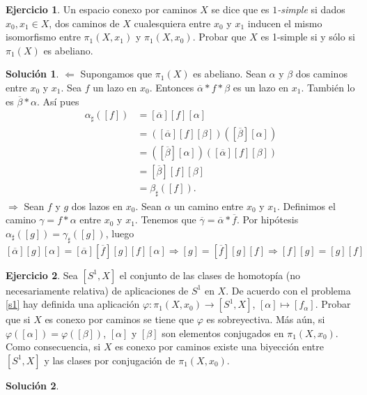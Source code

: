 \documentclass{article}
\theoremstyle{plain}
\theoremstyle{definition}
\newtheorem{exercise}{Ejercicio}
\newtheorem*{sol*}{Solución}
\begin{document}
\vspace{0.1cm}

\newpage \begin{exercise} Un espacio conexo por caminos $X$ se dice que es {\it $1$-simple} si
dados $x_0, x_1\in X$, dos caminos de $X$ cualesquiera entre $x_0$ y $x_1$ inducen el mismo
isomorfismo entre $\pi_1(X,x_1)$ y $\pi_1(X,x_0)$.
Probar que $X$ es 1-simple si y sólo si $\pi_1(X)$ es abeliano.
\end{exercise}
\begin{sol*}
$\boxed{\Leftarrow}$ Supongamos que $\pi_1(X)$ es abeliano. Sean $\alpha$ y $\beta$ dos caminos entre $x_0$ y $x_1$. Sea $f$ un lazo en $x_0$. Entonces $\overline{\alpha}*f*\beta$ es un lazo en $x_1$. También lo es $\overline{\beta}*\alpha$. Así pues
\begin{align*}
\alpha_\sharp([f])&=[\overline{\alpha}][f][\alpha]\\
				  &=([\overline{\alpha}][f][\beta])([\overline{\beta}][\alpha])\\
				  &=([\overline{\beta}][\alpha])([\overline{\alpha}][f][\beta])\\
				  &=[\overline{\beta}][f][\beta]\\
				  &=\beta_\sharp([f]).
\end{align*}
$\boxed{\Rightarrow}$ Sean $f$ y $g$ dos lazos en $x_0$. Sean $\alpha$ un camino entre $x_0$ y $x_1$. Definimos el camino $\gamma=f*\alpha$ entre $x_0$ y $x_1$. Tenemos que $\overline{\gamma}=\overline{\alpha}*\overline{f}$. Por hipótesis $\alpha_\sharp([g])=\gamma_\sharp([g])$, luego 
\[
[\overline{\alpha}][g][\alpha]=[\overline{\alpha}][\overline{f}][g][f][\alpha]\Rightarrow [g]=[\overline{f}][g][f]\Rightarrow [f][g]=[g][f]
\]
\end{sol*}

\newpage 
\begin{exercise}
Sea $[S^1,X]$ el conjunto de las clases de homotopía (no necesariamente relativa) de aplicaciones de $S^1$ en $X$. De acuerdo con el problema \ref{s1} hay definida una aplicación $\varphi: \pi_1(X,x_0) \to [S^1,X]$, $[\alpha] \mapsto [f_{\alpha}]$. Probar que si $X$ es conexo por caminos se tiene que $\varphi$ es sobreyectiva. Más aún, si $\varphi ([\alpha]) = \varphi([\beta])$, $[\alpha]$ y $[\beta]$ son elementos conjugados en $\pi_1(X,x_0)$.
Como consecuencia, si $X$ es conexo por caminos existe una biyección entre $[S^1,X]$ y las clases por conjugación de $\pi_1(X,x_0)$.
\end{exercise}
\begin{sol*}

\end{sol*}
\end{document}
